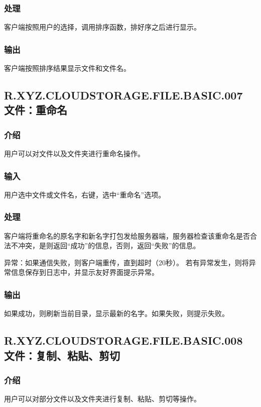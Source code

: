 \subsubsection{处理}
客户端按照用户的选择，调用排序函数，排好序之后进行显示。

\subsubsection{输出}
客户端按照排序结果显示文件和文件名。



\subsection{R.XYZ.CLOUDSTORAGE.FILE.BASIC.007 文件：重命名}

\subsubsection{介绍} 
用户可以对文件以及文件夹进行重命名操作。

\subsubsection{输入} 
用户选中文件或文件名，右键，选中“重命名”选项。

\subsubsection{处理}
客户端将重命名的原名字和新名字打包发给服务器端，服务器检查该重命名是否合法不冲突，是则返回“成功”的信息，否则，返回“失败”的信息。

异常：如果通信失败，则客户端重传，直到超时（20秒）。
若有异常发生，则将异常信息保存到日志中，并显示友好界面提示异常。

\subsubsection{输出}
如果成功，则刷新当前目录，显示最新的名字。如果失败，则提示失败。


\subsection{R.XYZ.CLOUDSTORAGE.FILE.BASIC.008 文件：复制、粘贴、剪切}

\subsubsection{介绍} 
用户可以对部分文件以及文件夹进行复制、粘贴、剪切等操作。

